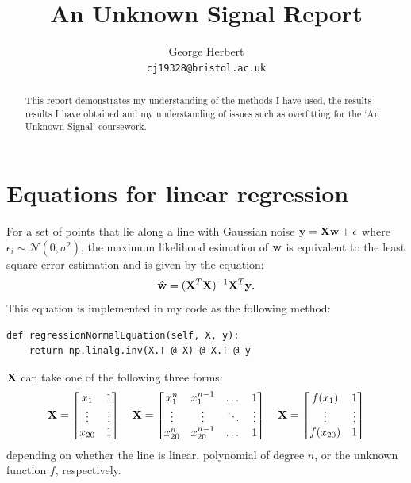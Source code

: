 \documentclass[onecolumn, 12pt, a4paper]{article}
\author{
  George Herbert\\
  \texttt{cj19328@bristol.ac.uk}
}
\title{An Unknown Signal Report}
\begin{document}
\maketitle

\begin{abstract}
    This report demonstrates my understanding of the methods I have 
    used, the results results I have obtained and my understanding
    of issues such as overfitting for the `An Unknown Signal'
    coursework.
\end{abstract}

\section{Equations for linear regression}

For a set of points that lie along a line with Gaussian noise 
$\vb{y} = \vb{X}\vb{w} + \vb{\epsilon}$ where $\epsilon_{i} \sim \mathcal{N}(0, \sigma^{2})$,
the maximum likelihood esimation of $\vb{w}$ is equivalent to
the least square error estimation and is given by the equation:
\[
    \vb{\hat{w}} = (\vb{X}^{T}\vb{X})^{-1}\vb{X}^{T}\vb{y}.
\]
This equation is implemented in my code as the following
method:
\begin{verbatim}
def regressionNormalEquation(self, X, y):
    return np.linalg.inv(X.T @ X) @ X.T @ y
\end{verbatim}

$\vb{X}$ can take one of the following
three forms:
\[
\vb{X} =
\begin{bmatrix}
    x_{1} & 1 \\
    \vdots & \vdots \\
    x_{20} & 1 \\
\end{bmatrix}
\quad
\vb{X} =
\begin{bmatrix}
    x_{1}^{n} & x_{1}^{n-1} & \dots & 1 \\
    \vdots & \vdots & \ddots & \vdots \\
    x_{20}^{n} & x_{20}^{n-1} & \dots & 1 \\
\end{bmatrix}
\quad
\vb{X} =
\begin{bmatrix}
    f(x_{1}) & 1 \\
    \vdots & \vdots \\
    f(x_{20}) & 1 \\
\end{bmatrix}
\]
depending on whether the line is linear, polynomial of degree $n$,
or the unknown function $f$, respectively.
\end{document}
